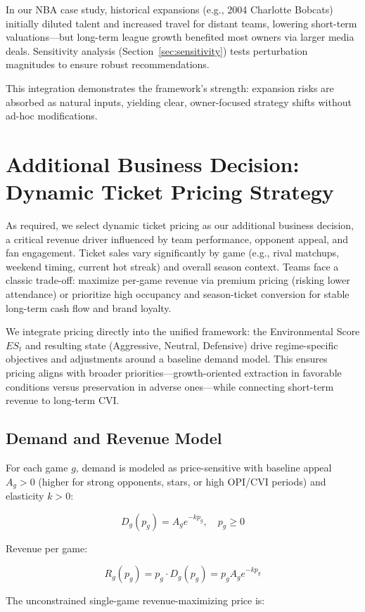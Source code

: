 \documentclass{mcmthesis}
\begin{document}
In our NBA case study, historical expansions (e.g., 2004 Charlotte Bobcats) initially diluted talent and increased travel for distant teams, lowering short-term valuations—but long-term league growth benefited most owners via larger media deals. Sensitivity analysis (Section~\ref{sec:sensitivity}) tests perturbation magnitudes to ensure robust recommendations.

This integration demonstrates the framework's strength: expansion risks are absorbed as natural inputs, yielding clear, owner-focused strategy shifts without ad-hoc modifications.

\section{Additional Business Decision: Dynamic Ticket Pricing Strategy}
\label{sec:ticket}

As required, we select dynamic ticket pricing as our additional business decision, a critical revenue driver influenced by team performance, opponent appeal, and fan engagement. Ticket sales vary significantly by game (e.g., rival matchups, weekend timing, current hot streak) and overall season context. Teams face a classic trade-off: maximize per-game revenue via premium pricing (risking lower attendance) or prioritize high occupancy and season-ticket conversion for stable long-term cash flow and brand loyalty.

We integrate pricing directly into the unified framework: the Environmental Score $ES_t$ and resulting state (Aggressive, Neutral, Defensive) drive regime-specific objectives and adjustments around a baseline demand model. This ensures pricing aligns with broader priorities—growth-oriented extraction in favorable conditions versus preservation in adverse ones—while connecting short-term revenue to long-term CVI.

\subsection{Demand and Revenue Model}
For each game $g$, demand is modeled as price-sensitive with baseline appeal $A_g > 0$ (higher for strong opponents, stars, or high OPI/CVI periods) and elasticity $k > 0$:

\[
D_g(p_g) = A_g e^{-k p_g}, \quad p_g \geq 0
\]

Revenue per game:

\[
R_g(p_g) = p_g \cdot D_g(p_g) = p_g A_g e^{-k p_g}
\]

The unconstrained single-game revenue-maximizing price is:
\end{document}
